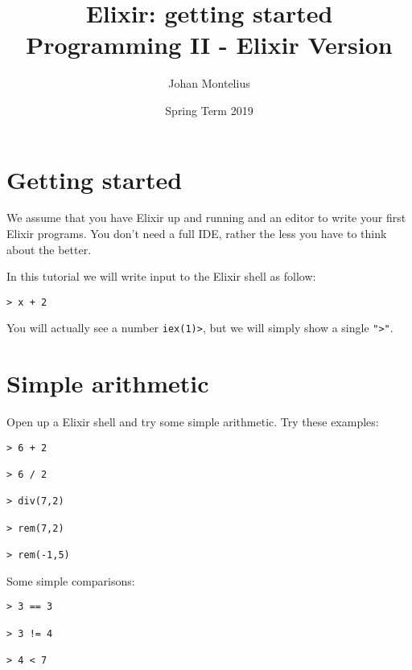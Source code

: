 \documentclass[a4paper,11pt]{article}
\begin{document}

\title{
    \textbf{Elixir: getting started}\\
    \large{Programming II - Elixir Version}
}
\author{Johan Montelius}
\date{Spring Term 2019}
\maketitle
{}



\section*{Getting started}

We assume that you have Elixir up and running and an editor to write
your first Elixir programs. You don't need a full IDE, rather the
less you have to think about the better.


In this tutorial we will write input to the Elixir shell as follow:

\begin{verbatim}
> x + 2
\end{verbatim}

You will actually see a number {\tt iex(1)>}, but we will simply
show a single {\tt ">"}.  



\section{Simple arithmetic}

Open up a Elixir shell and try some simple arithmetic. Try these examples:

\begin{verbatim}
> 6 + 2

> 6 / 2

> div(7,2)

> rem(7,2)

> rem(-1,5)
\end{verbatim}

Some simple comparisons:

\begin{verbatim}
> 3 == 3

> 3 != 4

> 4 < 7
\end{verbatim}
\end{document}

